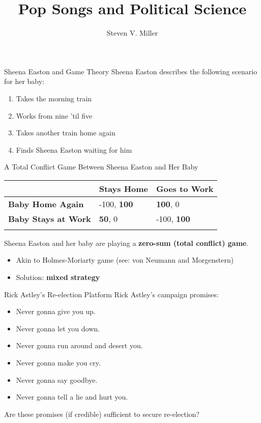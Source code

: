 \documentclass[
  ignorenonframetext,
]{beamer}
\title{Pop Songs and Political Science}
\author{Steven V. Miller}
\date{}
\institute{Department of Political Science}
\providecommand{\tightlist}{%
  \setlength{\itemsep}{0pt}\setlength{\parskip}{0pt}}\usepackage{longtable,booktabs,array}
\begin{document}
\frame{\titlepage}


\begin{frame}{Sheena Easton and Game Theory}
\label{sheena-easton-and-game-theory}
Sheena Easton describes the following scenario for her baby:

\begin{enumerate}
\tightlist
\item
  Takes the morning train
\item
  Works from nine 'til five
\item
  Takes another train home again
\item
  Finds Sheena Easton waiting for him
\end{enumerate}
\end{frame}

\begin{frame}{A Total Conflict Game Between Sheena Easton and Her Baby}
\label{a-total-conflict-game-between-sheena-easton-and-her-baby}
\begin{longtable}[]{@{}lll@{}}
\toprule\noalign{}
& Stays Home & Goes to Work \\
\midrule\noalign{}
\endhead
\textbf{Baby Home Again} & -100, \textbf{100} & \textbf{100}, 0 \\
\textbf{Baby Stays at Work} & \textbf{50}, 0 & -100, \textbf{100} \\
\bottomrule\noalign{}
\end{longtable}

Sheena Easton and her baby are playing a \textbf{zero-sum (total
conflict) game}.

\begin{itemize}
\tightlist
\item
  Akin to Holmes-Moriarty game (see: von Neumann and Morgenstern)
\item
  Solution: \textbf{mixed strategy}
\end{itemize}
\end{frame}

\begin{frame}{Rick Astley's Re-election Platform}
\label{rick-astleys-re-election-platform}
Rick Astley's campaign promises:

\begin{itemize}
\tightlist
\item
  Never gonna give you up.
\item
  Never gonna let you down.
\item
  Never gonna run around and desert you.
\item
  Never gonna make you cry.
\item
  Never gonna say goodbye.
\item
  Never gonna tell a lie and hurt you.
\end{itemize}

Are these promises (if credible) sufficient to secure re-election?
\end{frame}
\end{document}
